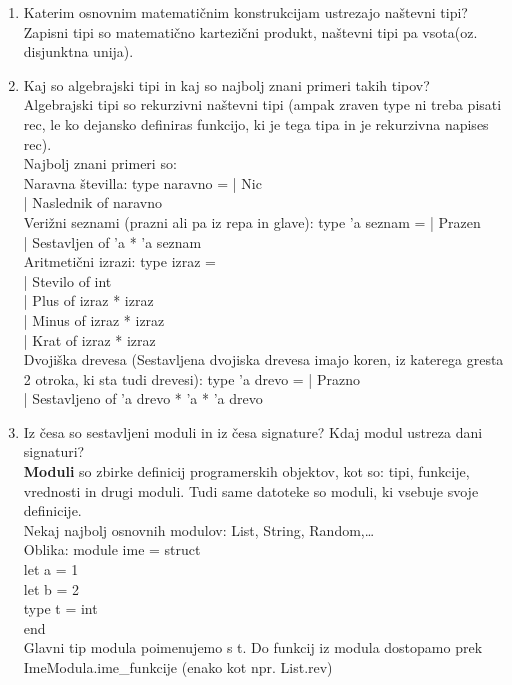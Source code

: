 \documentclass[a4paper]{article}
\begin{document}
\begin{enumerate}
        \item Katerim osnovnim matematičnim konstrukcijam ustrezajo naštevni tipi?\\
        Zapisni tipi so matematično kartezični produkt, naštevni tipi pa vsota(oz. disjunktna unija).
    
        \item Kaj so algebrajski tipi in kaj so najbolj znani primeri takih tipov?\\
        Algebrajski tipi so rekurzivni naštevni tipi (ampak zraven type ni treba pisati rec, le ko dejansko definiras funkcijo, ki je tega tipa in je rekurzivna napises rec).\\
        Najbolj znani primeri so:\\
        Naravna številla: type naravno = | Nic\\
        | Naslednik of naravno\\
        Verižni seznami (prazni ali pa iz repa in glave): type 'a seznam = | Prazen\\
        | Sestavljen of 'a * 'a seznam\\
        Aritmetični izrazi: type izraz = \\| Stevilo of int\\
        | Plus of izraz * izraz\\
        | Minus of izraz * izraz\\
        | Krat of izraz * izraz\\
        Dvojiška drevesa (Sestavljena dvojiska drevesa imajo koren, iz katerega gresta 2 otroka, ki sta tudi drevesi): type 'a drevo = | Prazno\\
        | Sestavljeno of 'a drevo * 'a * 'a drevo
    
        \item Iz česa so sestavljeni moduli in iz česa signature? Kdaj modul ustreza dani signaturi?\\
        \textbf{Moduli} so zbirke definicij programerskih objektov, kot so: tipi, funkcije, vrednosti in drugi moduli. Tudi same datoteke so moduli, ki vsebuje svoje definicije.\\
        Nekaj najbolj osnovnih modulov: List, String, Random,\dots\\
        Oblika: module ime = struct\\
            let a = 1\\
            let b = 2\\
            type t = int\\
        end\\
        Glavni tip modula poimenujemo s t. Do funkcij iz modula dostopamo prek ImeModula.ime\_funkcije (enako kot npr. List.rev)



\end{enumerate}
\end{document}

